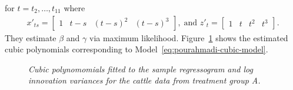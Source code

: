 \documentclass[12pt]{article}
\begin{document}
\noindent
for $t = t_2,\dots, t_{11}$ where 
\begin{align*}
x'_{ts} = \begin{bmatrix} 1 & t - s& \left(t - s\right)^2 & \left(t - s\right)^3 \end{bmatrix},\; \mbox{and } z'_{t} = \begin{bmatrix} 1 & t& t^2& t^3 \end{bmatrix}.
\end{align*}
\noindent
They estimate $\beta$ and $\gamma$ via maximum likelihood.  Figure~\ref{fig:cattleA-smoothed-regressogram-variogram} shows the estimated cubic polynomials corresponding to Model~\eqref{eq:pourahmadi-cubic-model}.  
 \begin{figure}[H]
\begin{center}
  \hfill
 \caption{\textit{Cubic polynomomials fitted to the sample regressogram and log innovation variances for the cattle data from treatment group A.}} \label{fig:cattleA-smoothed-regressogram-variogram}
 \end{center}
\end{figure}
\end{document}

